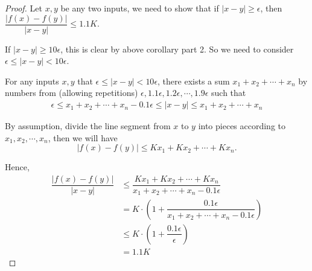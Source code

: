 \documentclass{llncs}
\begin{document}
\begin{proof}
	Let $x,y$ be any two inputs, we need to show that if $|x-y|\geq \epsilon$, then $\dfrac{|f(x)-f(y)|}{|x-y|}\leq 1.1 K$. 
	
	If $|x-y| \geq 10\epsilon$, this is clear by above corollary part 2. So we need to consider $\epsilon\leq |x-y|< 10\epsilon$.
	
	For any inputs $x,y$ that $\epsilon\leq|x-y|< 10\epsilon$, there exists a sum $x_1+x_2+\cdots+x_n$ by numbers from (allowing repetitions) $\epsilon, 1.1\epsilon, 1.2\epsilon, \cdots, 1.9\epsilon$ such that \begin{align*}
	 \epsilon \leq x_1+x_2+\cdots+x_n -0.1\epsilon \leq |x-y| \leq x_1+x_2+\cdots+x_n
	\end{align*}
	
	By assumption, divide the line segment from $x$ to $y$ into pieces according to $x_1, x_2,\cdots,x_n$, then we will have $$|f(x)-f(y)|\leq Kx_1+Kx_2+\cdots+Kx_n.$$
	
	Hence,\begin{align*}
		\dfrac{|f(x)-f(y)|}{|x-y|} &\leq \dfrac{Kx_1+Kx_2+\cdots+Kx_n}{x_1+x_2+\cdots+x_n -0.1\epsilon}\\
		& = K\cdot( 1+  \dfrac{0.1\epsilon}{x_1+x_2+\cdots+x_n -0.1\epsilon})\\
		& \leq K\cdot( 1+  \dfrac{0.1\epsilon}{\epsilon})\\
		& = 1.1 K
	\end{align*}
	
\end{proof}
\end{document}
